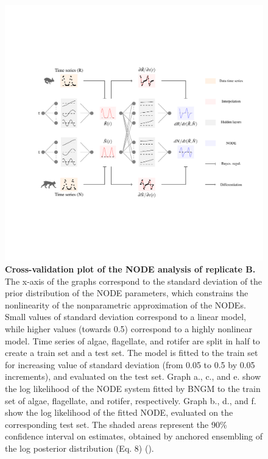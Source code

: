 \documentclass[11pt, oneside]{article}
\begin{document}
\newpage
\begin{figure}[H]
\includegraphics[width=1\linewidth,page=18]{figures/main.pdf}
\caption{
\textbf{Cross-validation plot of the NODE analysis of replicate B.}
The x-axis of the graphs correspond to the standard deviation of the prior distribution of the NODE parameters, which constrains the nonlinearity of the nonparametric approximation of the NODEs.
Small values of standard deviation correspond to a linear model, while higher values (towards 0.5) correspond to a highly nonlinear model.
Time series of algae, flagellate, and rotifer are split in half to create a train set and a test set. 
The model is fitted to the train set for increasing value of standard deviation (from 0.05 to 0.5 by 0.05 increments), and evaluated on the test set.
Graph a., c., and e. show the log likelihood of the NODE system fitted by BNGM to the train set of algae, flagellate, and rotifer, respectively.
Graph b., d., and f. show the log likelihood of the fitted NODE, evaluated on the corresponding test set.
The shaded areas represent the 90\% confidence interval on estimates, obtained by anchored ensembling of the log posterior distribution (Eq. 8) (\cite{Pearce2018}).
}
\end{figure}
\newpage
\end{document}

